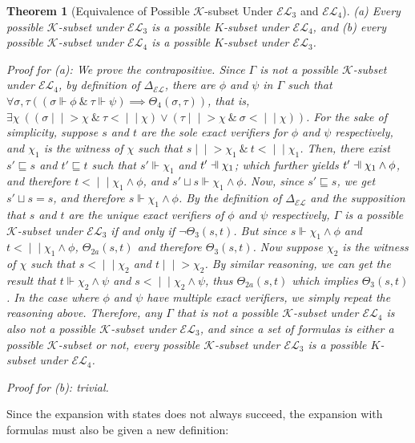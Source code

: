 \documentclass[12pt]{article}
\newtheorem{theorem}{Theorem}[section]
\newcommand{\fal}{\mathrel{\text{\reflectbox{$\Vdash$}}}}
\newcommand{\ver}{\Vdash}
\newcommand{\inever}{\mid \! \mid \!\!>}
\newcommand{\inefal}{< \! \! \mid \! \mid}
\newcommand{\K}{\mathcal{K}}
\begin{document}
\begin{theorem}[Equivalence of Possible $\K$-subset Under $\mathcal{EL}_3$ and $\mathcal{EL}_4$]
    \emph{(a)} Every possible $\K$-subset under $\mathcal{EL}_3$ is a possible $K$-subset under $\mathcal{EL}_4$, and \emph{(b)} every possible $\K$-subset under $\mathcal{EL}_4$ is a possible $K$-subset under $\mathcal{EL}_3$.
    \par
    Proof for \emph{(a):} We prove the contrapositive. Since $\Gamma$ is not a possible $\K$-subset under $\mathcal{EL}_4$, by definition of $\Delta_\mathcal{EL}$, there are $\phi$ and $\psi$ in $\Gamma$ such that $\forall \sigma, \tau ((\sigma \ver \phi \ \& \ \tau \ver \psi) \implies \Theta_4(\sigma, \tau))$, that is, $\exists \chi \ ((\sigma \inever \chi \ \& \  \tau \inefal \chi) \lor (\tau \inever \chi \ \& \  \sigma \inefal \chi))$. For the sake of simplicity, suppose $s$ and $t$ are the sole exact verifiers for $\phi$ and $\psi$ respectively, and $\chi_1$ is the witness of $\chi$ such that $s \inever \chi_1 \ \& \ t \inefal \chi_1$. Then, there exist $s' \sqsubseteq s$ and $t' \sqsubseteq t$ such that $s' \ver \chi_1$ and $t' \fal \chi_1$; which further yields $t' \fal \chi_1 \land \phi$, and therefore $t \inefal \chi_1 \land \phi$, and $s' \sqcup s \ver \chi_1 \land \phi$. Now, since $s' \sqsubseteq s$, we get $s' \sqcup s = s$, and therefore $s \ver \chi_1 \land \phi$. By the definition of $\Delta_\mathcal{EL}$ and the supposition that $s$ and $t$ are the unique exact verifiers of $\phi$ and $\psi$ respectively, $\Gamma$ is a possible $\K$-subset under $\mathcal{EL}_3$ if and only if $\lnot \Theta_3(s, t)$. But since $s \ver \chi_1 \land \phi$ and $t \inefal \chi_1 \land \phi$, $\Theta_{2a}(s, t)$ and therefore $\Theta_3(s, t)$. Now suppose $\chi_2$ is the witness of $\chi$ such that $s \inefal \chi_2$ and $t \inever \chi_2$. By similar reasoning, we can get the result that $t \ver \chi_2 \land \psi$ and $s \inefal \chi_2 \land \psi$, thus $\Theta_{2a}(s, t)$ which implies $\Theta_3(s, t)$. In the case where $\phi$ and $\psi$ have multiple exact verifiers, we simply repeat the reasoning above. Therefore, any $\Gamma$ that is not a possible $\K$-subset under $\mathcal{EL}_4$ is also not a possible $\K$-subset under $\mathcal{EL}_3$, and since a set of formulas is either a possible $\K$-subset or not, every possible $\K$-subset under $\mathcal{EL}_3$ is a possible $K$-subset under $\mathcal{EL}_4$. 
    \par
    Proof for \emph{(b):} trivial.
\end{theorem}
Since the expansion with states does not always succeed, the expansion with formulas must also be given a new definition:
\end{document}
